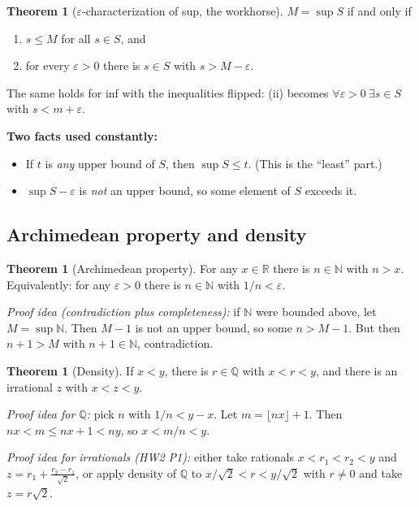 \documentclass[11pt]{article}
\theoremstyle{definition}
\newtheorem{thm}[defn]{Theorem}
\newcommand{\N}{\mathbb{N}}
\newcommand{\Q}{\mathbb{Q}}
\newcommand{\R}{\mathbb{R}}
\newcommand{\eps}{\varepsilon}
\newcommand{\key}[1]{\textcolor{red!70!black}{\textbf{#1}}}
\begin{document}
\begin{thm}[$\eps$-characterization of sup, the workhorse]
\label{thm:epssup}
$M=\sup S$ if and only if
\begin{enumerate}[nosep,label=(\roman*)]
  \item $s\le M$ for all $s\in S$, and
  \item for every $\eps>0$ there is $s\in S$ with $s>M-\eps$.
\end{enumerate}
The same holds for inf with the inequalities flipped: (ii) becomes
$\forall\eps>0\ \exists s\in S$ with $s<m+\eps$.
\end{thm}

\noindent\key{Two facts used constantly:}
\begin{itemize}[nosep]
  \item If $t$ is \emph{any} upper bound of $S$, then $\sup S\le t$.
        (This is the ``least'' part.)
  \item $\sup S-\eps$ is \emph{not} an upper bound, so some element of $S$
        exceeds it.
\end{itemize}

\subsection{Archimedean property and density}
\begin{thm}[Archimedean property]
For any $x\in\R$ there is $n\in\N$ with $n>x$. Equivalently: for any
$\eps>0$ there is $n\in\N$ with $1/n<\eps$.
\end{thm}
\noindent\emph{Proof idea (contradiction plus completeness):} if $\N$
were bounded above, let $M=\sup\N$. Then $M-1$ is not an upper bound, so
some $n>M-1$. But then $n+1>M$ with $n+1\in\N$, contradiction.

\begin{thm}[Density]
If $x<y$, there is $r\in\Q$ with $x<r<y$, and there is an irrational $z$
with $x<z<y$.
\end{thm}
\noindent\emph{Proof idea for $\Q$:} pick $n$ with $1/n<y-x$. Let
$m=\lfloor nx\rfloor+1$. Then $nx<m\le nx+1<ny$, so $x<m/n<y$.

\noindent\emph{Proof idea for irrationals (HW2 P1):} either take rationals
$x<r_1<r_2<y$ and $z=r_1+\frac{r_2-r_1}{\sqrt2}$, or apply density of $\Q$
to $x/\sqrt2<r<y/\sqrt2$ with $r\ne0$ and take $z=r\sqrt2$.
\end{document}
